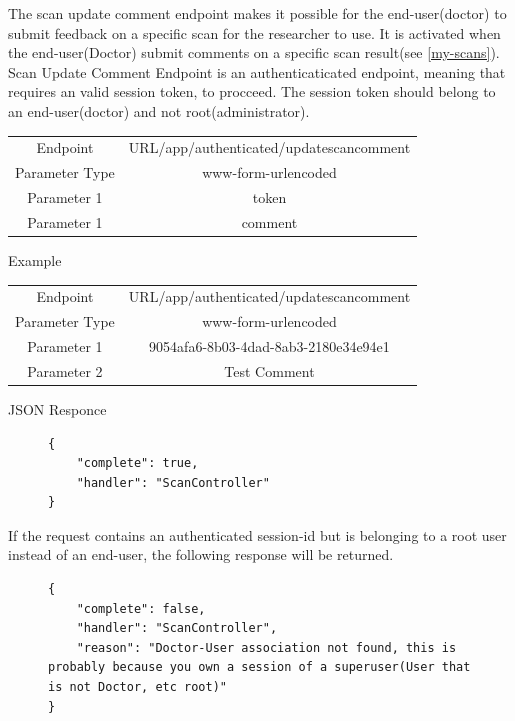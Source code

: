 					The scan update comment endpoint makes it possible for the end-user(doctor) to submit feedback on a specific scan for the researcher to use. 
					It is activated when the end-user(Doctor) submit comments on a specific scan result(see \ref{my-scans}). Scan Update Comment Endpoint is an authenticaticated endpoint, 
					meaning that requires an valid session token, to procceed.  The session token should belong to an end-user(doctor) and not root(administrator).
					\begin{center}
						\begin{tabular}{ |c|c| } 
							\hline
							Endpoint & {{URL}}/app/authenticated/updatescancomment\\
							Parameter Type & www-form-urlencoded  \\
							Parameter 1 & token  \\
							Parameter 1 & comment  \\
							\hline
						\end{tabular}
					\end{center}
					Example
					\begin{center}
						\begin{tabular}{ |c|c| } 
							\hline
							Endpoint & {{URL}}/app/authenticated/updatescancomment\\
							Parameter Type & www-form-urlencoded  \\
							Parameter 1 & 9054afa6-8b03-4dad-8ab3-2180e34e94e1  \\
							Parameter 2 & Test Comment  \\
							\hline
						\end{tabular}
					\end{center}
					JSON Responce
					\begin{figure}[H]
						\iftrue
						\begin{lstlisting}[]
{
	"complete": true,
	"handler": "ScanController"
}
						\end{lstlisting}
					\end{figure}
					If the request contains an authenticated session-id but is belonging to a root user instead of an end-user, the following response will be returned.
					\begin{figure}[H]
						\iftrue
						\begin{lstlisting}[]
{	
	"complete": false,
	"handler": "ScanController",
	"reason": "Doctor-User association not found, this is probably because you own a session of a superuser(User that is not Doctor, etc root)"
}
						\end{lstlisting}
					\end{figure}
